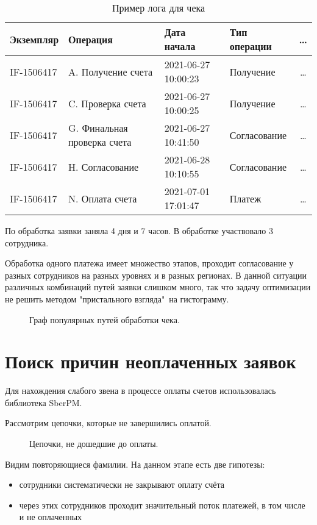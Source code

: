 \documentclass[12pt]{article}
\newcommand{\imgh}[3]
{
\begin{figure}[h]
\center{\texttt{[image: \#2]}}
\caption{#3}
\label{ris:#2}
\end{figure}
}
\begin{document}
\begin{table}[H]
    \begin{tabular}{llllc}
    \hline
    Экземпляр &                    Операция &         Дата начала & Тип операции & \dots \\
    \hline
    IF-1506417 &          A. Получение счета & 2021-06-27 10:00:23 &    Получение & \dots \\
    IF-1506417 &           C. Проверка счета & 2021-06-27 10:00:25 &    Получение & \dots \\
    IF-1506417 & G. Финальная проверка счета & 2021-06-27 10:41:50 & Согласование & \dots \\
    IF-1506417 &             H. Согласование & 2021-06-28 10:10:55 & Согласование & \dots \\
    IF-1506417 &             N. Оплата счета & 2021-07-01 17:01:47 &       Платеж & \dots \\
    \hline
    \end{tabular}
\caption{Пример лога для чека}
\end{table}

По обработка заявки заняла 4 дня и 7 часов. В обработке участвовало 3 сотрудника.

Обработка одного платежа имеет множество этапов, проходит согласование у разных сотрудников на разных уровнях и в разных регионах. В данной ситуации различных комбинаций путей заявки слишком много, так что задачу оптимизации не решить методом "пристального взгляда"\ на гистограмму.


\imgh{19cm}{metric_graph.png}{Граф популярных путей обработки чека.}
\newpage

\section{Поиск причин неоплаченных заявок}
Для нахождения слабого звена в процессе оплаты счетов использовалась библиотека SberPM.

Рассмотрим цепочки, которые не завершились оплатой.
\imgh{17cm}{not_paid.png}{Цепочки, не дошедшие до оплаты.}

Видим повторяющиеся фамилии. На данном этапе есть две гипотезы:
\begin{itemize}
    \item сотрудники систематически не закрывают оплату счёта
    \item через этих сотрудников проходит значительный поток платежей, в том числе и не оплаченных
\end{itemize}
\end{document}
